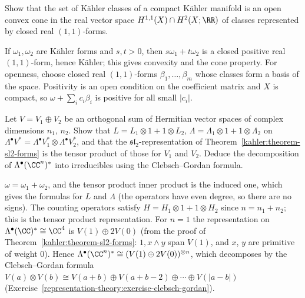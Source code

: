 \begin{exercise}\label{kahler:exercise-kahler-cone}
Show that the set of K\"ahler classes of a compact K\"ahler manifold is an open convex cone in the real vector space
$H^{1,1}(X) \cap H^2(X; \RR)$ of classes represented by closed real $(1,1)$-forms.
\end{exercise}

\begin{solution}
If $\omega_1, \omega_2$ are K\"ahler forms and $s, t > 0$, then $s\omega_1 + t\omega_2$ is a closed positive real $(1,1)$-form, hence K\"ahler; this
gives convexity and the cone property. For openness, choose closed real $(1,1)$-forms $\beta_1, \ldots, \beta_m$ whose classes form a basis of the
space. Positivity is an open condition on the coefficient matrix and $X$ is compact, so $\omega + \sum_ic_i\beta_i$ is positive for all small
$|c_i|$.
\end{solution}

\begin{exercise}\label{kahler:exercise-product-lefschetz}
Let $V = V_1 \oplus V_2$ be an orthogonal sum of Hermitian vector spaces of complex dimensions $n_1$, $n_2$. Show that
$L = L_1 \otimes 1 + 1 \otimes L_2$, $\Lambda = \Lambda_1 \otimes 1 + 1 \otimes \Lambda_2$ on $\Lambda^\bullet V^* = \Lambda^\bullet V_1^* \otimes \Lambda^\bullet V_2^*$,
and that the $\mathfrak{sl}_2$-representation of Theorem~\ref{kahler:theorem-sl2-forms} is the tensor product of those for $V_1$ and $V_2$.
Deduce the decomposition of $\Lambda^\bullet(\CC^n)^*$ into irreducibles using the Clebsch--Gordan formula.
\end{exercise}

\begin{solution}
$\omega = \omega_1 + \omega_2$, and the tensor product inner product is the induced one, which gives the formulas for $L$ and $\Lambda$ (the
operators have even degree, so there are no signs). The counting operators satisfy $H = H_1 \otimes 1 + 1 \otimes H_2$ since $n = n_1 + n_2$;
this is the tensor product representation. For $n = 1$ the representation on $\Lambda^\bullet(\CC)^* \cong \CC^4$ is $V(1) \oplus 2V(0)$ (from
the proof of Theorem~\ref{kahler:theorem-sl2-forms}: $1, x \wedge y$ span $V(1)$, and $x$, $y$ are primitive of weight $0$). Hence
$\Lambda^\bullet(\CC^n)^* \cong (V(1) \oplus 2V(0))^{\otimes n}$, which decomposes by the Clebsch--Gordan formula $V(a) \otimes V(b) \cong V(a + b) \oplus V(a + b - 2) \oplus \cdots \oplus V(|a - b|)$
(Exercise~\ref{representation-theory:exercise-clebsch-gordan}).
\end{solution}

